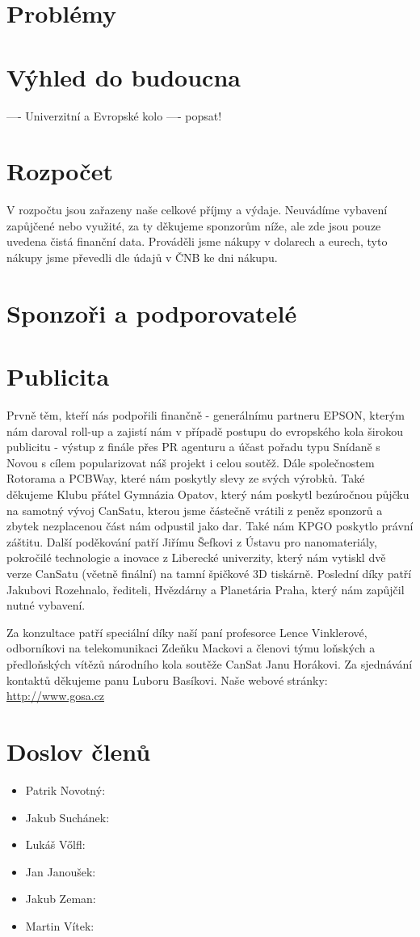 \documentclass{article}
\begin{document}
\section{Problémy}
\section{Výhled do budoucna}
 ---- Univerzitní a Evropské kolo ---- popsat!
\section{Rozpočet}
\item V rozpočtu jsou zařazeny naše celkové příjmy a výdaje. Neuvádíme vybavení zapůjčené nebo využité, za ty děkujeme sponzorům níže, ale zde jsou pouze uvedena čistá finanční data. Prováděli jsme nákupy v dolarech a eurech, tyto nákupy jsme převedli dle údajů v ČNB ke dni nákupu.
\section{Sponzoři a podporovatelé}

\section{Publicita}
\item Prvně těm, kteří nás podpořili finančně - generálnímu partneru EPSON, kterým nám daroval roll-up a zajistí nám v případě postupu do evropského kola širokou publicitu - výstup z finále přes PR agenturu a účast pořadu typu Snídaně s Novou s cílem popularizovat náš projekt i celou soutěž.  Dále společnostem Rotorama a PCBWay, které nám poskytly slevy ze svých výrobků. Také děkujeme Klubu přátel Gymnázia Opatov, který nám poskytl bezúročnou půjčku na samotný vývoj CanSatu, kterou jsme částečně vrátili z peněz sponzorů a zbytek nezplacenou část nám odpustil jako dar. Také nám KPGO poskytlo právní záštitu. Další poděkování patří Jiřímu Šefkovi z Ústavu pro nanomateriály, pokročilé technologie a inovace z Liberecké univerzity, který nám vytiskl dvě verze CanSatu (včetně finální) na tamní špičkové 3D tiskárně. Poslední díky patří Jakubovi Rozehnalo, řediteli, Hvězdárny a Planetária Praha, který nám zapůjčil nutné vybavení.
\item Za konzultace patří speciální díky naší paní profesorce Lence Vinklerové, odborníkovi na telekomunikaci Zdeňku Mackovi a členovi týmu loňských a předloňských vítězů národního kola soutěže CanSat Janu Horákovi. Za sjednávání kontaktů děkujeme panu Luboru Basíkovi.
Naše webové stránky: \url{http://www.gosa.cz}\\
\section{Doslov členů}
\begin{itemize}
\item Patrik Novotný:
\item Jakub Suchánek:
\item Lukáš Vőlfl:
\item Jan Janoušek:
\item Jakub Zeman:
\item Martin Vítek:
\end{itemize}
\end{document}
